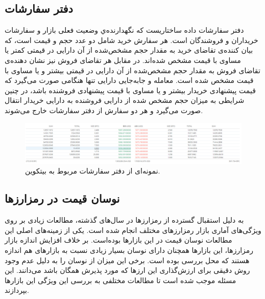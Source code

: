 \subsection{دفتر سفارشات}
دفتر سفارشات داده ساختاریست که نگهدارنده‌ي وضعیت فعلی بازار و سفارشات خریداران و فروشندگان است. هر سفارش خرید شامل دو عدد حجم و قیمت است، که بیان کننده‌ی تقاضای خرید به مقدار حجم مشخص‌شده از آن دارایی در قیمتی کمتر یا مساوی با قیمت مشخص شده‌اند. در مقابل هر تقاضای فروش نیز نشان دهنده‌ی تقاضای فروش به مقدار حجم مشخص‌شده از آن دارایی در قیمتی بیشتر و یا مساوی با قیمت مشخص شده است. معامله و جابه‌جایی دارایی تنها هنگامی صورت می‌گیرد که قیمت پیشنهادی خریدار بیشتر و یا مساوی با قیمت پیشنهادی فروشنده باشد، در چنین شرایطی به میزان حجم مشخص شده از دارایی فروشنده به دارایی خریدار انتقال صورت می‌گیرد و هر دو سفارش از دفتر سفارشات خارج می‌شوند.
\begin{figure}[!t]
	\includegraphics[width=1.0 \textwidth]{images/orderbook}
	\centering
	\caption{ نمونه‌ای از دفتر سفارشات مربوط به بیتکوین.
	}
	\label{fig.panda}
\end{figure}
\subsection{نوسان قیمت در رمزارزها}
به دلیل استقبال گسترده از رمزارزها در سال‌های گذشته، مطالعات زیادی بر روی ویژگی‌های آماری بازار رمزارز‌های مختلف انجام شده است. یکی از زمینه‌های اصلی این مطالعات نوسان قیمت در این بازارها بوده‌است. بر خلاف افزایش اندازه بازار رمزارز‌ها، این بازارها همچنان دارای نوسان بسیار زیادی نسبت به بازار‌های هم اندازه‌ هستند که محل بررسی بوده است\cite{katsiampa2017volatility}. برخی این میزان از نوسان را به دلیل عدم وجود روش دقیقی برای ارزش‌گذاری این ارزها که مورد پذیرش همگان باشد می‌دانند. این مسئله موجب شده است تا مطالعات مختلفی به بررسی این ویژگی این بازارها بپردازند.
